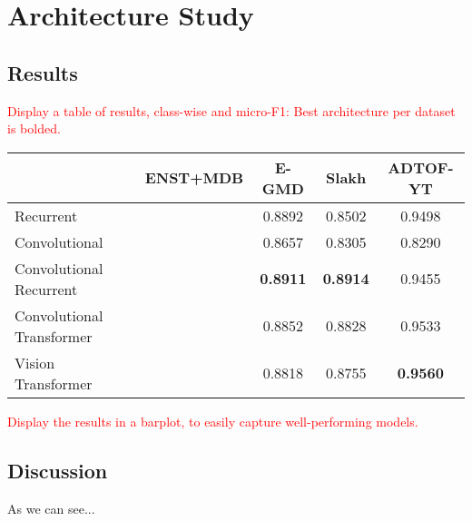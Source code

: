 \chapter{Architecture Study}

\section{Results}

\textcolor{red}{Display a table of results, class-wise and micro-F1:
Best architecture per dataset is bolded.}

\begin{center}
    \begin{tabular}{|l|c|c|c|c|}
    \hline
                   & ENST+MDB & E-GMD & Slakh & ADTOF-YT \\
    \hline
    Recurrent &       & 0.8892          & 0.8502          & 0.9498          \\
    Convolutional &       & 0.8657          & 0.8305          & 0.8290          \\
    Convolutional Recurrent &       & \textbf{0.8911}          & \textbf{0.8914}          & 0.9455          \\
    Convolutional Transformer &        & 0.8852          & 0.8828          & 0.9533          \\
    Vision Transformer &       & 0.8818          & 0.8755          & \textbf{0.9560}         \\   
    \hline

    \end{tabular}
\end{center}		

\textcolor{red}{Display the results in a barplot, to easily capture well-performing models.}

\section{Discussion}

As we can see...